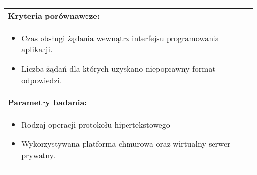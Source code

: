 \begin{longtable}[c]{|llll|}
{\begin{itemize}[label={}]
          \end{itemize}
    }                                                           \\ \hline
    \multicolumn{4}{|l|}{\textbf{Kryteria porównawcze:}}                             \\ \hline
    \multicolumn{4}{|p{\linewidth}|}{
        \begin{itemize}
            \item Czas obsługi żądania wewnątrz interfejsu programowania aplikacji.
            \item Liczba żądań dla których uzyskano niepoprawny format odpowiedzi.
        \end{itemize}
    }                                                           \\ \hline
    \multicolumn{4}{|l|}{\textbf{Parametry badania:}}                                \\ \hline
    \multicolumn{4}{|p{\linewidth}|}{
        \begin{itemize}
            \item Rodzaj operacji protokołu hipertekstowego.
            \item Wykorzystywana platforma chmurowa oraz wirtualny serwer prywatny.
        \end{itemize}
    }                                                           \\ \hline
\end{longtable}